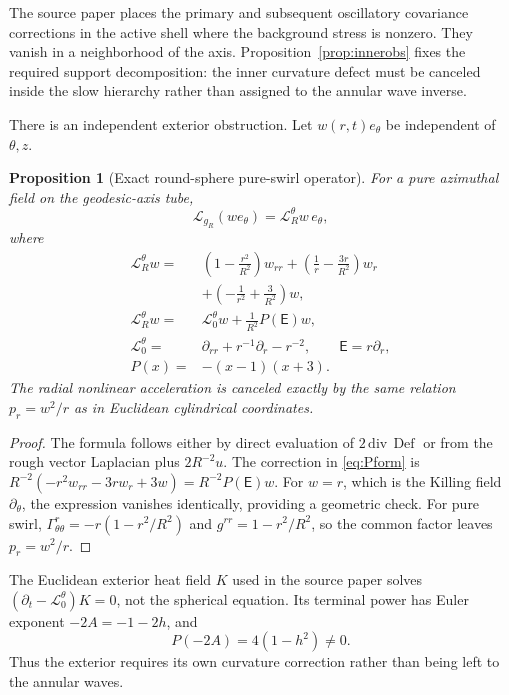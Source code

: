 \documentclass[aps,prd,reprint,superscriptaddress,nofootinbib,floatfix]{revtex4-2}
\newtheorem{proposition}[theorem]{Proposition}
\theoremstyle{definition}
\theoremstyle{remark}
\newcommand{\Def}{\operatorname{Def}}
\newcommand{\cL}{\mathcal{L}}
\newcommand{\Eul}{\mathsf E}
\begin{document}
The source paper places the primary and subsequent oscillatory covariance corrections in the active shell where the background stress is nonzero. They vanish in a neighborhood of the axis. Proposition~\ref{prop:innerobs} fixes the required support decomposition: the inner curvature defect must be canceled inside the slow hierarchy rather than assigned to the annular wave inverse.

There is an independent exterior obstruction. Let $w(r,t)e_\theta$ be independent of $\theta,z$.

\begin{proposition}[Exact round-sphere pure-swirl operator]\label{prop:swirlop}
	For a pure azimuthal field on the geodesic-axis tube,
	\begin{equation}
		\cL_{g_R}(w e_\theta)=\cL_R^\theta w\,e_\theta,
	\end{equation}
	where
	\begin{align}
		\cL_R^\theta w={} & \left(1-\frac{r^2}{R^2}\right)w_{rr}
		+\left(\frac1r-\frac{3r}{R^2}\right)w_r\nonumber                               \\
		                  & +\left(-\frac1{r^2}+\frac3{R^2}\right)w,\label{eq:swirlop} \\
		\cL_R^\theta w={} & \cL_0^\theta w+\frac1{R^2}P(\Eul)w,\label{eq:Pform}        \\
		\cL_0^\theta={}   & \partial_{rr}+r^{-1}\partial_r-r^{-2},\qquad
		\Eul=r\partial_r,                                                              \\
		P(x)={}           & -(x-1)(x+3).
	\end{align}
	The radial nonlinear acceleration is canceled exactly by the same relation $p_r=w^2/r$ as in Euclidean cylindrical coordinates.
\end{proposition}

\begin{proof}
	The formula follows either by direct evaluation of $2\,\mathrm{div}\,\Def$ or from the rough vector Laplacian plus $2R^{-2}u$. The correction in \eqref{eq:Pform} is
	$R^{-2}(-r^2w_{rr}-3rw_r+3w)=R^{-2}P(\Eul)w$. For $w=r$, which is the Killing field $\partial_\theta$, the expression vanishes identically, providing a geometric check. For pure swirl, $\Gamma^r_{\theta\theta}=-r(1-r^2/R^2)$ and $g^{rr}=1-r^2/R^2$, so the common factor leaves $p_r=w^2/r$.
\end{proof}

The Euclidean exterior heat field $K$ used in the source paper solves $(\partial_t-\cL_0^\theta)K=0$, not the spherical equation. Its terminal power has Euler exponent $-2A=-1-2h$, and
\begin{equation}
	P(-2A)=4(1-h^2)\neq0.
\end{equation}
Thus the exterior requires its own curvature correction rather than being left to the annular waves.
\end{document}
